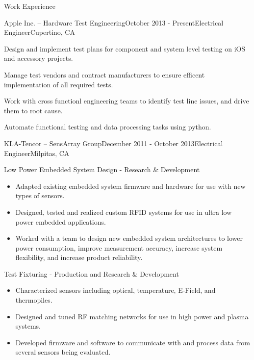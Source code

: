 \documentclass{resume} %
\begin{document}

\begin{rSection}{Work Experience}
\vspace{-0.5em}
\begin{rSubsection}{Apple Inc. -- Hardware Test Engineering}{October 2013 - Present}{Electrical Engineer}{Cupertino, CA}
\item Design and implement test plans for component and system level testing on iOS and accessory projects.
\item Manage test vendors and contract manufacturers to ensure efficent implementation of all required tests.
\item Work with cross functionl engineering teams to identify test line issues, and drive them to root cause.
\item Automate functional testing and data processing tasks using python.
\end{rSubsection}


\begin{rSubsection2}{KLA-Tencor -- SensArray Group}{December 2011 - October 2013}{Electrical Engineer}{Milpitas, CA}
\item Low Power Embedded System Design - Research \& Development 
\begin{itemize}
\itemsep -0.5em \vspace{-0.5em}
\renewcommand{\labelitemi}{-}
\item Adapted existing embedded system firmware and hardware for use with new types of sensors.
\item Designed, tested and realized custom RFID systems for use in ultra low power embedded applications.
\item Worked with a team to design new embedded system architectures to lower power consumption, improve measurement accuracy, increase system flexibility, and increase product reliability.
\end{itemize}

\item Test Fixturing - Production and Research \& Development
\begin{itemize}
\itemsep -0.5em \vspace{-0.5em}
\renewcommand{\labelitemi}{-}
\item Characterized sensors including optical, temperature, E-Field, and thermopiles.
\item Designed and tuned RF matching networks for use in high power and plasma systems.
\item Developed firmware and software to communicate with and process data from several sensors being evaluated.
\end{itemize}
\end{rSubsection2}


\end{rSection}
\end{document}
